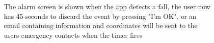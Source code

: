 \documentclass[12pt, a4paper, onecolumn]{article}
\begin{document}
	\begin{figure}[H]
		\centering
		\caption{The alarm screen is shown when the app detects a fall, the user now has 45 seconds to discard the event by pressing "I'm OK", or an email containing information and coordinates will be sent to the users emergency contacts when the timer fires}%
		\label{fig:alarm-screen}%
	\end{figure}



		



\end{document}
